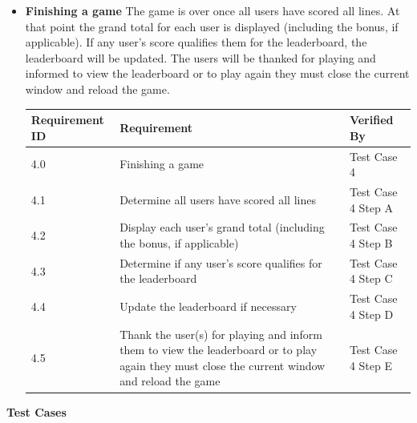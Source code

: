 \documentclass[]{report}   %
\begin{document}
\begin{itemize}
\item \textbf{Finishing a game} The game is over once all users have scored all lines. At that point the grand total for each user is displayed (including the bonus, if applicable). If any user's score qualifies them for the leaderboard, the leaderboard will be updated. The users will be thanked for playing and informed to view the leaderboard or to play again they must close the current window and reload the game.
    \begin{center}
    \begin{tabular}{ | l | p{3.5in} | l | }
    \hline
    \textbf{Requirement ID} & \textbf{Requirement} & \textbf{Verified By} \\ \hline
    4.0 & Finishing a game & Test Case 4\\ \hline
    4.1 & Determine all users have scored all lines & Test Case 4 Step A\\ \hline
    4.2 & Display each user's grand total (including the bonus, if applicable) & Test Case 4 Step B\\ \hline
    4.3 & Determine if any user's score qualifies for the leaderboard & Test Case 4 Step C\\ \hline
    4.4 & Update the leaderboard if necessary & Test Case 4 Step D\\ \hline
    4.5 & Thank the user(s) for playing and inform them to view the leaderboard or to play again they must close the current window and reload the game & Test Case 4 Step E\\ \hline
    \end{tabular}
    \end{center}


\end{itemize}
\textbf{Test Cases}



\renewcommand{\labelenumii}{\Alph{enumii}.}
\renewcommand{\labelenumiii}{\roman{enumiii}.}
\end{document}
